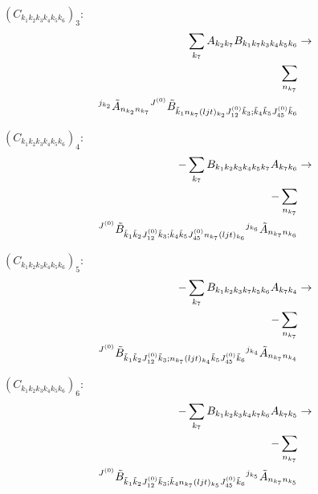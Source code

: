 \documentclass[11pt]{article}
\begin{document}
$\left({C}_{{k}_{1}{k}_{2}{k}_{3}{k}_{4}{k}_{5}{k}_{6}}\right)_{3}$:
\begin{align}
\sum_{{k}_{7}}{A}_{{k}_{2}{k}_{7}}{B}_{{k}_{1}{k}_{7}{k}_{3}{k}_{4}{k}_{5}{k}_{6}}&\rightarrow \notag \\\sum_{n_{{k}_{7}}}& \notag \\{}^{j_{{k}_{2}}}\tilde{A}_{n_{{k}_{2}}n_{{k}_{7}}}{}^{J^{(0)}}\tilde{B}_{\tilde{k}_{1}n_{{k}_{7}}(ljt)_{{k}_{2}}J^{(0)}_{12}\tilde{k}_{3};\tilde{k}_{4}\tilde{k}_{5}J^{(0)}_{45}\tilde{k}_{6}}& \notag \\
\end{align}

$\left({C}_{{k}_{1}{k}_{2}{k}_{3}{k}_{4}{k}_{5}{k}_{6}}\right)_{4}$:
\begin{align}
-\sum_{{k}_{7}}{B}_{{k}_{1}{k}_{2}{k}_{3}{k}_{4}{k}_{5}{k}_{7}}{A}_{{k}_{7}{k}_{6}}&\rightarrow \notag \\-\sum_{n_{{k}_{7}}}& \notag \\{}^{J^{(0)}}\tilde{B}_{\tilde{k}_{1}\tilde{k}_{2}J^{(0)}_{12}\tilde{k}_{3};\tilde{k}_{4}\tilde{k}_{5}J^{(0)}_{45}n_{{k}_{7}}(ljt)_{{k}_{6}}}{}^{j_{{k}_{6}}}\tilde{A}_{n_{{k}_{7}}n_{{k}_{6}}}& \notag \\
\end{align}

$\left({C}_{{k}_{1}{k}_{2}{k}_{3}{k}_{4}{k}_{5}{k}_{6}}\right)_{5}$:
\begin{align}
-\sum_{{k}_{7}}{B}_{{k}_{1}{k}_{2}{k}_{3}{k}_{7}{k}_{5}{k}_{6}}{A}_{{k}_{7}{k}_{4}}&\rightarrow \notag \\-\sum_{n_{{k}_{7}}}& \notag \\{}^{J^{(0)}}\tilde{B}_{\tilde{k}_{1}\tilde{k}_{2}J^{(0)}_{12}\tilde{k}_{3};n_{{k}_{7}}(ljt)_{{k}_{4}}\tilde{k}_{5}J^{(0)}_{45}\tilde{k}_{6}}{}^{j_{{k}_{4}}}\tilde{A}_{n_{{k}_{7}}n_{{k}_{4}}}& \notag \\
\end{align}

$\left({C}_{{k}_{1}{k}_{2}{k}_{3}{k}_{4}{k}_{5}{k}_{6}}\right)_{6}$:
\begin{align}
-\sum_{{k}_{7}}{B}_{{k}_{1}{k}_{2}{k}_{3}{k}_{4}{k}_{7}{k}_{6}}{A}_{{k}_{7}{k}_{5}}&\rightarrow \notag \\-\sum_{n_{{k}_{7}}}& \notag \\{}^{J^{(0)}}\tilde{B}_{\tilde{k}_{1}\tilde{k}_{2}J^{(0)}_{12}\tilde{k}_{3};\tilde{k}_{4}n_{{k}_{7}}(ljt)_{{k}_{5}}J^{(0)}_{45}\tilde{k}_{6}}{}^{j_{{k}_{5}}}\tilde{A}_{n_{{k}_{7}}n_{{k}_{5}}}& \notag \\
\end{align}
\end{document}
